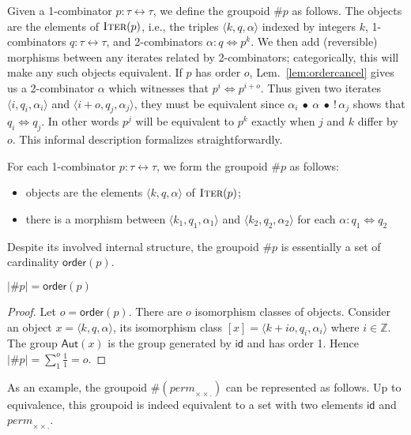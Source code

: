 \documentclass[a4paper,USenglish]{lipics-v2016-utf8x}
\newcommand{\hash}{\#}
\newcommand{\iso}{\leftrightarrow}
\newcommand{\isotwo}{\Leftrightarrow}
\newcommand{\order}[1]{\hash #1}
\newcommand{\ord}[1]{\ensuremath{\mathsf{order}(#1)}}
\newcommand{\Z}{\mathbb{Z}}
\newcommand{\iter}[1]{\textsc{Iter}(#1)}
\newcommand{\triple}[3]{\langle #1,#2,#3 \rangle}
\newcommand{\permtwo}{\mathit{perm}_{\times\!\times.}}
\newcommand{\idiso}{\mathsf{{id}}}
\newcommand{\idisotwo}{\mathsf{{id}}}
\begin{document}
Given a 1-combinator $p : \tau\iso\tau$, we define the groupoid $\order{p}$ as
follows. The objects are the elements of $\iter{p}$, i.e., the triples
$\triple{k}{q}{\alpha}$ indexed by integers $k$, 1-combinators
$q : \tau\iso\tau$, and 2-combinators $\alpha : q \isotwo p^k$. We then add
(reversible) morphisms between any iterates related by 2-combinators;
categorically, this will make any such objects equivalent.  If $p$ has order
$o$, Lem.~\ref{lem:ordercancel} gives us a 2-combinator $\alpha$ which witnesses
that $p^i \isotwo p^{i+o}$.  Thus given two iterates $\triple{i}{q_i}{\alpha_i}$
and $\triple{i+o}{q_j}{\alpha_j}$, they must be equivalent since
$\alpha_i~\bullet~\alpha~\bullet~!\,\alpha_j$ shows that $q_i \isotwo q_j$.  In
other words $p^j$ will be equivalent to $p^k$ exactly when $j$ and $k$ differ by
$o$.  This informal description formalizes straightforwardly.

\begin{definition}[$\order{p}$] For each 1-combinator $p : \tau\iso\tau$, we form the groupoid $\order{p}$ as follows:
\begin{itemize}
\item objects are the elements $\triple{k}{q}{\alpha}$ of $\iter{p}$;
\item there is a morphism between $\triple{k_1}{q_1}{\alpha_1}$ and $\triple{k_2}{q_2}{\alpha_2}$ for each $\alpha : q_1 \isotwo q_2$
\end{itemize}
\end{definition}

Despite its involved internal structure, the groupoid $\order{p}$ is essentially
a set of cardinality $\ord{p}$.

\begin{lemma}
  $|\order{p}| = \ord{p}$
\end{lemma}
\begin{proof}
  Let $o = \ord{p}$. There are $o$ isomorphism classes of
  objects. Consider an object $x = \triple{k}{q}{\alpha}$, its
  isomorphism class $[x] = \triple{k+io}{q_i}{\alpha_i}$ where
  $i \in \Z$. The group $\textsf{Aut}(x)$ is the group generated by
  $\idisotwo$ and has order 1. Hence
  $|\order{p}| = \sum\limits_{1}^{o}\frac{1}{1} = o$.
\end{proof}

As an example, the groupoid $\order{(\permtwo)}$ can be represented as follows. Up to equivalence, this groupoid is indeed equivalent to a set with two elements $\idiso$ and $\permtwo$.
\end{document}
